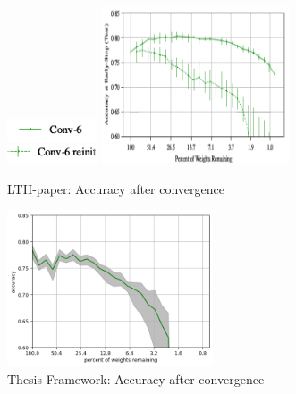 \begin{figure}
	\begin{minipage}{\textwidth}
		\centering
		\includegraphics[width=100px]{gfx/7-Evaluation/LTH_4_legend.png}
	\end{minipage}
	\begin{minipage}{0.5\textwidth}
		\centering
		\includegraphics[height=175px]{gfx/7-Evaluation/LTH_CNN_clean.png}
		\caption*{LTH-paper: Accuracy after convergence}
		\label{?}
	\end{minipage}\hfill
	\begin{minipage}{0.5\textwidth}
		\centering
		\includegraphics[height=175px]{gfx/Experiments/Reproduction-CIFAR10-CNN/accuracy/LTH.png}
		\caption*{Thesis-Framework: Accuracy after convergence}
		\label{?}
	\end{minipage}
\end{figure}

